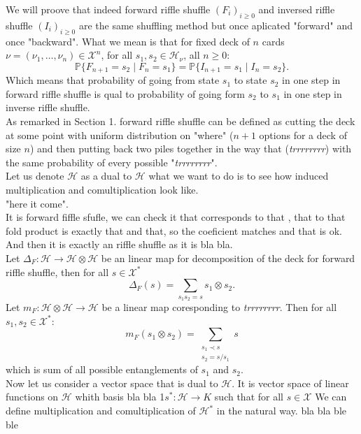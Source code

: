 \documentclass[a4paper, 12pt]{report}
\begin{document}
We will proove that indeed forward riffle shuffle $(F_i)_{i \geq 0}$ and inversed riffle shuffle
$(I_i)_{i \geq 0}$ are the same shuffling method
but once aplicated "forward" and once "backward". What we mean is that for fixed deck of $n$ cards
$\nu = (\nu_1, \dots, \nu_n) \in \mathcal{X}^n$, for all $s_1, s_2 \in \mathcal{H}_\nu$, all $n \geq 0$:
\begin{equation*}
\mathbb{P}\{F_{n+1} = s_2 \mid F_n = s_1\} = \mathbb{P}\{I_{n+1} = s_1 \mid I_n = s_2\}.
\end{equation*}
Which means that probability of going from state $s_1$ to state $s_2$ in one step in forward riffle shuffle
is qual to probability of going form $s_2$ to $s_1$ in one step in  inverse riffle shuffle. \\
As remarked in Section 1. forward riffle shuffle can be defined as cutting the deck at some point with
uniform distribution on "where" ($n+1$ options for a deck of size $n$) and then putting back
two piles together in the way that 
(\textit{trrrrrrrr}) with
the same probability of every possible "\textit{trrrrrrrr}". \\
Let us denote $\mathcal{H}$ as a dual to $\mathcal{H}$ what we want to do is to see how induced
multiplication and comultiplication look like. \\
"here it come". \\
It is forward fiffle sfufle, we can check it
that corresponds to that , that to that
fold product is exactly that and that, so the coeficient matches and that is ok. \\
And then it is exactly an riffle shuffle as it is bla bla. \\
Let $\Delta_F : \mathcal{H} \to \mathcal{H} \otimes \mathcal{H}$ be an linear map for decomposition
of the deck for forward riffle shuffle, then for all $s \in \mathcal{X}^*$
\begin{equation*}
\Delta_F(s) = \sum_{s_1s_2=s} s_1 \otimes s_2.
\end{equation*}
Let $m_F : \mathcal{H} \otimes \mathcal{H} \to \mathcal{H}$ be a linear map coresponding to
\textit{trrrrrrrr}. Then for all $s_1, s_2 \in \mathcal{X}^*$:
\begin{equation*}
m_F (s_1 \otimes s_2) = \sum_{\substack{s_1 \prec s \\ s_2 = s/s_1} } s
\end{equation*}
which is sum of all possible entanglements of $s_1$ and $s_2$.\\[8pt]
Now let us consider a vector space that is dual to $\mathcal{H}$. It is vector space of linear functions on
$\mathcal{H}$
whith basis bla bla
1$s^* : \mathcal{H} \to K$ such that for all $s \in \mathcal{X }$
We can define multiplication and comultiplication of $\mathcal{H}^*$ in the natural way.
bla bla
ble ble
\end{document}
